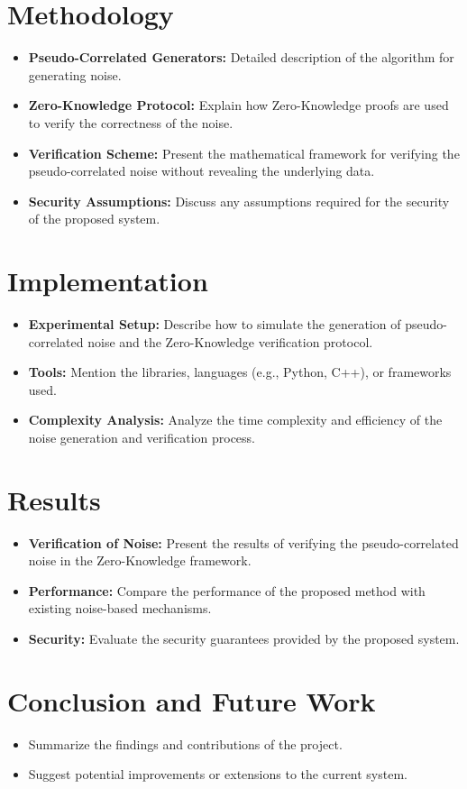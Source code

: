 \documentclass[11pt]{article}
\begin{document}
\section{Methodology}
\begin{itemize}
    \item \textbf{Pseudo-Correlated Generators:} Detailed description of the algorithm for generating noise.
    \item \textbf{Zero-Knowledge Protocol:} Explain how Zero-Knowledge proofs are used to verify the correctness of the noise.
    \item \textbf{Verification Scheme:} Present the mathematical framework for verifying the pseudo-correlated noise without revealing the underlying data.
    \item \textbf{Security Assumptions:} Discuss any assumptions required for the security of the proposed system.
\end{itemize}

\section{Implementation}
\begin{itemize}
    \item \textbf{Experimental Setup:} Describe how to simulate the generation of pseudo-correlated noise and the Zero-Knowledge verification protocol.
    \item \textbf{Tools:} Mention the libraries, languages (e.g., Python, C++), or frameworks used.
    \item \textbf{Complexity Analysis:} Analyze the time complexity and efficiency of the noise generation and verification process.
\end{itemize}

\section{Results}
\begin{itemize}
    \item \textbf{Verification of Noise:} Present the results of verifying the pseudo-correlated noise in the Zero-Knowledge framework.
    \item \textbf{Performance:} Compare the performance of the proposed method with existing noise-based mechanisms.
    \item \textbf{Security:} Evaluate the security guarantees provided by the proposed system.
\end{itemize}

\section{Conclusion and Future Work}
\begin{itemize}
    \item Summarize the findings and contributions of the project.
    \item Suggest potential improvements or extensions to the current system.
\end{itemize}



\end{document}
